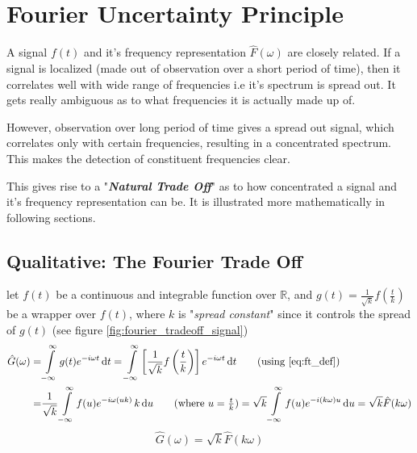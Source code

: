 \documentclass[11pt, a4paper]{article}
\let\oldsection\section
\renewcommand{\section}{%
	\setcounter{equation}{0}%
	\oldsection%
}
\newcommand{\eqrefnp}[1]{\textup{\ref{#1}}}
\newcommand{\diff}{\mathop{}\!\mathrm{d}}
\newcommand{\du}{\diff u}
\newcommand{\dt}{\diff t}
\newcommand{\dint}[2]{\int \limits_{#1}^{#2}}  %
\newcommand{\intinfty}{\dint{-\infty}{\infty}}	%
\begin{document}
\section{Fourier Uncertainty Principle}\label{sec:fourier_uncertainity_principle}
A signal $f(t)$ and it's frequency representation $\hat{F}(\omega)$ are closely related. If a signal is localized 
(made out of observation over a short period of time), then it correlates well with wide range of frequencies i.e it's spectrum is spread out. It gets really ambiguous as to what frequencies it is actually made up of.

However, observation over long period of time gives a spread out signal, which correlates only with certain frequencies, resulting in a concentrated spectrum. This makes the detection of constituent frequencies clear.

This gives rise to a "\textbf{\textit{Natural Trade Off}}" as to how concentrated a signal and it's frequency representation can be. It is illustrated more mathematically in following sections.

\subsection{Qualitative: The Fourier Trade Off}\label{sec:fourier_uncertainity_principle_qualitative}
let $f(t)$ be a continuous and integrable function over $\mathbb{R}$, and $g(t) = \frac{1}{\sqrt{k}} f \left( \frac{t}{k} \right)$ be a wrapper over $f(t)$, where $k$ is "\textit{spread constant}" since it controls the spread of $g(t)$ (see figure \ref{fig:fourier_tradeoff_signal}) \cite{dubey2021fourieruncertainity}
\begin{align*}
	\hat{G}(\omega) = & \intinfty g(t) e^{-i \omega t} \dt
	= \intinfty \left[ \frac{1}{\sqrt{k}} f \left( \frac{t}{k} \right) \right] e^{-i \omega t} \dt  \tag{using \eqrefnp{eq:ft_def}} \\
	= & \frac{1}{\sqrt{k}} \intinfty f(u) e^{-i \omega (uk)} \, k \du  \tag{where $u = \frac{t}{k}$} 
	= \sqrt{k} \intinfty f(u) e^{-i (k \omega) u} \du = \sqrt{k} \hat{F}(k \omega) 
\end{align*}
\begin{equation}\label{eq:fourier_tradeoff_spectrum}
	\boxed{
		\hat{G}(\omega) = \sqrt{k} \hat{F}(k \omega)
	}
\end{equation}
\end{document}
